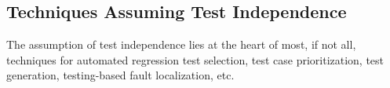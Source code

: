 



\subsection{Techniques Assuming Test Independence}

The assumption of test independence lies at the heart of most,
if not all, techniques for automated regression test selection,
test case prioritization, test generation, testing-based
fault localization, etc. 


